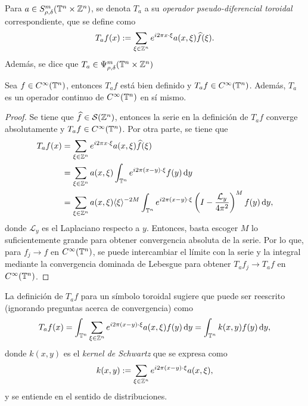 \begin{definition}
	Para $a\in S^m_{\rho, \delta}(\mathbb{T}^n\times\mathbb{Z}^n)$, se denota $T_a$ a su \textit{operador pseudo-diferencial toroidal} correspondiente, que se define como 
	\begin{equation*}
		T_af(x) := \sum_{\xi\in\mathbb{Z}^n} e^{i2\pi x\cdot\xi} a(x, \xi)\widehat{f}(\xi).
	\end{equation*}
	Además, se dice que $T_a\in\Psi^m_{\rho, \delta}(\mathbb{T}^n\times\mathbb{Z}^n)$
\end{definition}
\begin{proposition}
	Sea $f\in C^\infty(\mathbb{T}^n)$, entonces $T_af$ está bien definido y $T_af\in C^\infty(\mathbb{T}^n)$. Además, $T_a$ es un operador continuo de $C^\infty(\mathbb{T}^n)$ en sí mismo.
\end{proposition}
\begin{proof}
	Se tiene que $\widehat{f}\in\mathcal{S}(\mathbb{Z}^n)$, entonces la serie en la definición de $T_af$ converge absolutamente y $T_af\in C^\infty(\mathbb{T}^n)$. Por otra parte, se tiene que
	\begin{align*}
		T_af(x) &= \sum_{\xi\in\mathbb{Z}^n}e^{i2\pi x\cdot\xi} a(x, \xi) \widehat{f}(\xi) \\
		& = \sum_{\xi\in\mathbb{Z}^n}a(x, \xi) \int_{\mathbb{T}^n} e^{i2\pi (x-y)\cdot\xi} f(y) \mathop{}\!\mathrm{d} y\\
		& = \sum_{\xi\in\mathbb{Z}^n}a(x, \xi)\langle\xi\rangle^{-2M} \int_{\mathbb{T}^n} e^{i2\pi (x-y)\cdot\xi} \left(I-\frac{\mathcal{L}_y}{4\pi^2}\right)^M f(y) \mathop{}\!\mathrm{d} y,
	\end{align*}
	donde $\mathcal{L}_y$ es el Laplaciano respecto a $y$. Entonces, basta escoger $M$ lo suficientemente grande para obtener convergencia absoluta de la serie. Por lo que, para $f_j\to f$ en $C^\infty(\mathbb{T}^n)$, se puede intercambiar el límite con la serie y la integral mediante la convergencia dominada de Lebesgue para obtener $T_af_j\to T_af$ en $C^\infty(\mathbb{T}^n)$.
\end{proof}
\begin{remark}
	La definición de $T_af$ para un símbolo toroidal sugiere que puede ser reescrito (ignorando preguntas acerca de convergencia) como 
	\begin{equation*}
		T_af(x) = \int_{\mathbb{T}^n} \sum_{\xi\in\mathbb{Z}^n} e^{i2\pi (x-y)\cdot\xi} a(x, \xi) f(y) \mathop{}\!\mathrm{d} y =\int_{\mathbb{T}^n} k(x, y)f(y)\mathop{}\!\mathrm{d} y,
	\end{equation*}
	donde $k(x, y)$ es el \textit{kernel de Schwartz} que se expresa como 
	\begin{equation*}
		k(x, y) := \sum_{\xi\in\mathbb{Z}^n} e^{i2\pi (x-y)\cdot\xi} a(x, \xi),
	\end{equation*}
	y se entiende en el sentido de distribuciones. 
\end{remark}
